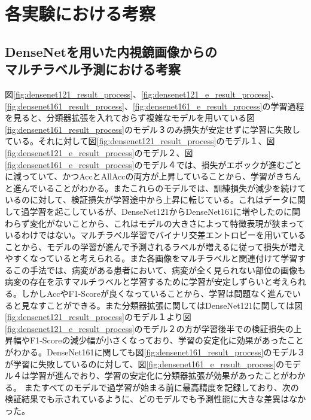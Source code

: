 \section{各実験における考察}
\subsection{DenseNetを用いた内視鏡画像からの\\マルチラベル予測における考察}
図\ref{fig:densenet121_result_process}、\ref{fig:densenet121_e_result_process}、\ref{fig:densenet161_result_process}、\ref{fig:densenet161_e_result_process}の学習過程を見ると、分類器拡張を入れておらず複雑なモデルを用いている図\ref{fig:densenet161_result_process}のモデル３のみ損失が安定せずに学習に失敗している。それに対して図\ref{fig:densenet121_result_process}のモデル１、図\ref{fig:densenet121_e_result_process}のモデル２、図\ref{fig:densenet161_e_result_process}のモデル４では、損失がエポックが進むごとに減っていて、かつAccとAllAccの両方が上昇していることから、学習がきちんと進んでいることがわかる。またこれらのモデルでは、訓練損失が減少を続けているのに対して、検証損失が学習途中から上昇に転じている。これはデータに関して過学習を起こしているが、DenseNet121からDenseNet161に増やしたのに関わらず変化がないことから、これはモデルの大きさによって特徴表現が狭まっているわけではない。マルチラベル学習でバイナリ交差エントロピーを用いていることから、モデルの学習が進んで予測されるラベルが増えるに従って損失が増えやすくなっていると考えられる。また各画像をマルチラベルと関連付けて学習するこの手法では、病変がある患者において、病変が全く見られない部位の画像も病変の存在を示すマルチラベルと学習するために学習が安定しずらいと考えられる。しかしAccやF1-Scoreが良くなっていることから、学習は問題なく進んでいると見なすことができる。また分類器拡張に関してはDenseNet121に関しては図\ref{fig:densenet121_result_process}のモデル１より図\ref{fig:densenet121_e_result_process}のモデル２の方が学習後半での検証損失の上昇幅やF1-Scoreの減少幅が小さくなっており、学習の安定化に効果があったことがわかる。DenseNet161に関しても図\ref{fig:densenet161_result_process}のモデル３が学習に失敗しているのに対して、図\ref{fig:densenet161_e_result_process}のモデル４は学習が進んでおり、学習の安定化に分類器拡張が効果があったことがわかる。
またすべてのモデルで過学習が始まる前に最高精度を記録しており、次の検証結果でも示されているように、どのモデルでも予測性能に大きな差異はなかった。

